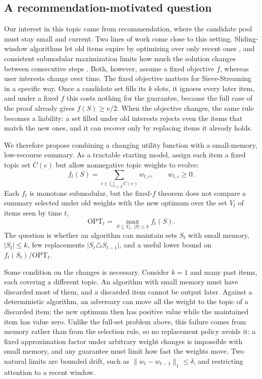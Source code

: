 \documentclass[10pt]{article}
\newcommand{\OPT}{\mathrm{OPT}}
\begin{document}
\subsection{A recommendation-motivated question}
Our interest in this topic came from recommendation, where the candidate pool must stay small and current. Two lines of work come close to this setting. Sliding-window algorithms let old items expire by optimizing over only recent ones \cite{chen2016sliding}, and consistent submodular maximization limits how much the solution changes between consecutive steps \cite{duetting2024consistent}. Both, however, assume a fixed objective $f$, whereas user interests change over time. The fixed objective matters for Sieve-Streaming in a specific way. Once a candidate set fills its $k$ slots, it ignores every later item, and under a fixed $f$ this costs nothing for the guarantee, because the full case of the proof already gives $f(S)\geq v/2$. When the objective changes, the same rule becomes a liability: a set filled under old interests rejects even the items that match the new ones, and it can recover only by replacing items it already holds.

We therefore propose combining a changing utility function with a small-memory, low-recourse summary. As a tractable starting model, assign each item a fixed topic set $C(e)$ but allow nonnegative topic weights to evolve:
\begin{equation}
  f_t(S)=\sum_{c\in\bigcup_{e\in S}C(e)}w_{t,c},\qquad w_{t,c}\geq0.
  \label{eq:drift}
\end{equation}
Each $f_t$ is monotone submodular, but the fixed-$f$ theorem does not compare a summary selected under old weights with the new optimum over the set $V_t$ of items seen by time $t$,
\begin{equation}
  \OPT_t=\max_{S\subseteq V_t,\ |S|\leq k}f_t(S).
  \label{eq:time-opt}
\end{equation}
The question is whether an algorithm can maintain sets $S_t$ with small memory, $|S_t|\leq k$, few replacements $|S_t\triangle S_{t-1}|$, and a useful lower bound on $f_t(S_t)/\OPT_t$.

Some condition on the changes is necessary. Consider $k=1$ and many past items, each covering a different topic. An algorithm with small memory must have discarded most of them, and a discarded item cannot be output later. Against a deterministic algorithm, an adversary can move all the weight to the topic of a discarded item; the new optimum then has positive value while the maintained item has value zero. Unlike the full-set problem above, this failure comes from memory rather than from the selection rule, so no replacement policy avoids it: a fixed approximation factor under arbitrary weight changes is impossible with small memory, and any guarantee must limit how fast the weights move. Two natural limits are bounded drift, such as $\|w_t-w_{t-1}\|_1\leq\delta$, and restricting attention to a recent window.
\end{document}
